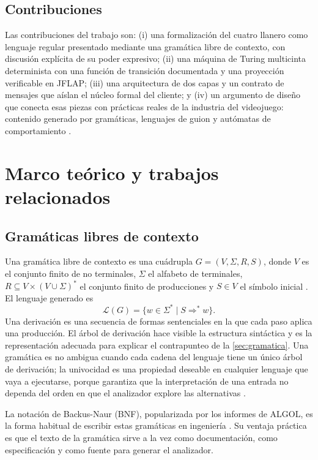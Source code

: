 \documentclass[9pt]{ieeeconf}
\newcommand{\Lang}{\mathcal{L}}
\begin{document}
\subsection{Contribuciones}
\label{sec:contribuciones}

Las contribuciones del trabajo son: (i) una formalización del cuatro llanero como lenguaje regular presentado mediante una gramática libre de contexto, con discusión explícita de su poder expresivo; (ii) una máquina de Turing multicinta determinista con una función de transición documentada y una proyección verificable en JFLAP; (iii) una arquitectura de dos capas y un contrato de mensajes que aíslan el núcleo formal del cliente; y (iv) un argumento de diseño que conecta esas piezas con prácticas reales de la industria del videojuego: contenido generado por gramáticas, lenguajes de guion y autómatas de comportamiento \cite{shaker2016,millington2019}.

\section{Marco teórico y trabajos relacionados}
\label{sec:marco}

\subsection{Gramáticas libres de contexto}
\label{sec:cfg}

Una gramática libre de contexto es una cuádrupla $G=(V,\Sigma,R,S)$, donde $V$ es el conjunto finito de no terminales, $\Sigma$ el alfabeto de terminales, $R\subseteq V\times(V\cup\Sigma)^*$ el conjunto finito de producciones y $S\in V$ el símbolo inicial \cite{hopcroft2006,sipser2012}. El lenguaje generado es
\begin{equation}
  \Lang(G)=\{w\in\Sigma^* \mid S\Rightarrow^* w\}.
  \label{eq:lenguaje}
\end{equation}
Una derivación es una secuencia de formas sentenciales en la que cada paso aplica una producción. El árbol de derivación hace visible la estructura sintáctica y es la representación adecuada para explicar el contrapunteo de la \cref{sec:gramatica}. Una gramática es no ambigua cuando cada cadena del lenguaje tiene un único árbol de derivación; la univocidad es una propiedad deseable en cualquier lenguaje que vaya a ejecutarse, porque garantiza que la interpretación de una entrada no dependa del orden en que el analizador explore las alternativas \cite{hopcroft2006}.

La notación de Backus-Naur (BNF), popularizada por los informes de ALGOL, es la forma habitual de escribir estas gramáticas en ingeniería \cite{aho2006,scott2015}. Su ventaja práctica es que el texto de la gramática sirve a la vez como documentación, como especificación y como fuente para generar el analizador.
\end{document}
